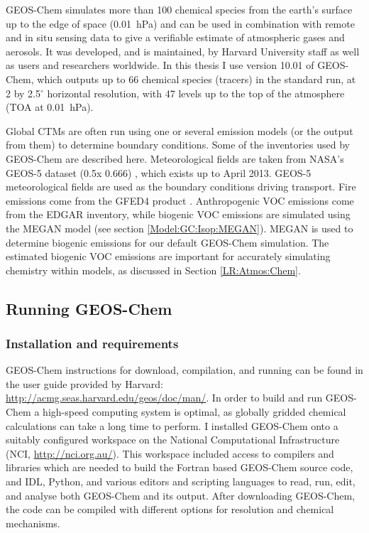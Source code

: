     GEOS-Chem simulates more than 100 chemical species from the earth's surface up to the edge of space (0.01~hPa) and can be used in combination with remote and in situ sensing data to give a verifiable estimate of atmospheric gases and aerosols.
    It was developed, and is maintained, by Harvard University staff as well as users and researchers worldwide.
    In this thesis I use version 10.01 of GEOS-Chem, which outputs up to 66 chemical species (tracers) in the standard run, at 2 by 2.5$^{\circ}$ horizontal resolution, with 47 levels up to the top of the atmosphere (TOA at 0.01~hPa). 
    
    
    Global CTMs are often run using one or several emission models (or the output from them) to determine boundary conditions.
    Some of the inventories used by GEOS-Chem are described here.
    Meteorological fields are taken from NASA's GEOS-5 dataset (0.5\degr x 0.666\degr) \parencite{Chen2009}, which exists up to April 2013.
    GEOS-5 meteorological fields are used as the boundary conditions driving transport.
    Fire emissions come from the GFED4 product \parencite{Giglio2013}. 
    Anthropogenic VOC emissions come from the EDGAR inventory, while biogenic VOC emissions are simulated using the MEGAN model (see section \ref{Model:GC:Isop:MEGAN}).
    MEGAN is used to determine biogenic emissions for our default GEOS-Chem simulation.
    The estimated biogenic VOC emissions are important for accurately simulating chemistry within models, as discussed in Section \ref{LR:Atmos:Chem}.
    
  
  \subsection{Running GEOS-Chem}
    \label{Model:GC:running}
    \subsubsection{Installation and requirements}
      GEOS-Chem instructions for download, compilation, and running can be found in the user guide provided by Harvard: \url{http://acmg.seas.harvard.edu/geos/doc/man/}.
      In order to build and run GEOS-Chem a high-speed computing system is optimal, as globally gridded chemical calculations can take a long time to perform.
      I installed GEOS-Chem onto a suitably configured workspace on the National Computational Infrastructure (NCI, \url{http://nci.org.au/}). 
      This workspace included access to compilers and libraries which are needed to build the Fortran based GEOS-Chem source code, and IDL, Python, and various editors and scripting languages to read, run, edit, and analyse both GEOS-Chem and its output.
      After downloading GEOS-Chem, the code can be compiled with different options for resolution and chemical mechanisms.
  
